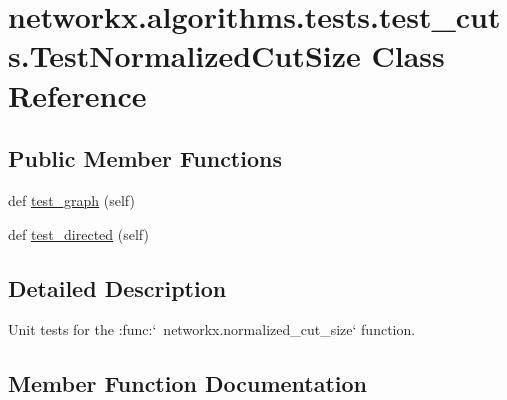 \hypertarget{classnetworkx_1_1algorithms_1_1tests_1_1test__cuts_1_1TestNormalizedCutSize}{}\section{networkx.\+algorithms.\+tests.\+test\+\_\+cuts.\+Test\+Normalized\+Cut\+Size Class Reference}
\label{classnetworkx_1_1algorithms_1_1tests_1_1test__cuts_1_1TestNormalizedCutSize}
\subsection*{Public Member Functions}
\begin{DoxyCompactItemize}
\item 
def \hyperlink{classnetworkx_1_1algorithms_1_1tests_1_1test__cuts_1_1TestNormalizedCutSize_a786f236bc8a2fefcdfa4f225d71cd8c8}{test\+\_\+graph} (self)
\item 
def \hyperlink{classnetworkx_1_1algorithms_1_1tests_1_1test__cuts_1_1TestNormalizedCutSize_a9e89f57af18cff59f08a9af35ce0c019}{test\+\_\+directed} (self)
\end{DoxyCompactItemize}


\subsection{Detailed Description}
\begin{DoxyVerb}Unit tests for the :func:`~networkx.normalized_cut_size`
function.\end{DoxyVerb}
 

\subsection{Member Function Documentation}
\mbox{\label{classnetworkx_1_1algorithms_1_1tests_1_1test__cuts_1_1TestNormalizedCutSize_a9e89f57af18cff59f08a9af35ce0c019}} 
